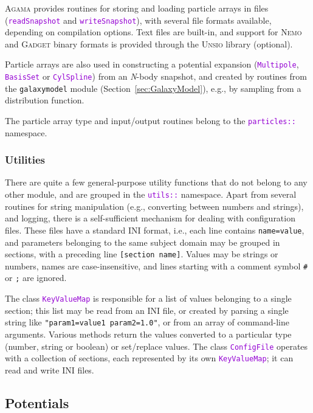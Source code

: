 \documentclass[12pt]{article}
\newcommand{\Agama}{\textsc{Agama}\xspace}
\newcommand{\Nemo} {\textsc{Nemo}\xspace}
\newcommand{\Nbody}{\textsl{N}-body\xspace}
\newcommand{\ttt}[1]{\textcolor{darkviolet}{\texttt{#1}}}
\newcommand{\ppp}[1]{\textcolor{darkolive} {\texttt{#1}}}
\begin{document}
\Agama provides routines for storing and loading particle arrays in files (\ttt{readSnapshot} and \ttt{writeSnapshot}), with several file formats available, depending on compilation options. Text files are built-in, and support for \Nemo and \textsc{Gadget} binary formats is provided through the \textsc{Unsio} library (optional).

Particle arrays are also used in constructing a potential expansion (\ttt{Multipole}, \ttt{BasisSet} or \ttt{CylSpline}) from an \Nbody snapshot, and created by routines from the \texttt{galaxymodel} module (Section~\ref{sec:GalaxyModel}), e.g., by sampling from a distribution function.

The particle array type and input/output routines belong to the \ttt{particles::} name\-space.


\subsubsection{Utilities}  \label{sec:Utilities}

There are quite a few general-purpose utility functions that do not belong to any other module, and are grouped in the \ttt{utils::} namespace. 
Apart from several routines for string manipulation (e.g., converting between numbers and strings), and logging, there is a self-sufficient mechanism for dealing with configuration files. These files have a standard INI format, i.e., each line contains \ppp{name=value}, and parameters belonging to the same subject domain may be grouped in sections, with a preceding line \ppp{[section name]}. Values may be strings or numbers, names are case-insensitive, and lines starting with a comment symbol \texttt{\#} or \texttt{;} are ignored.

The class \ttt{KeyValueMap} is responsible for a list of values belonging to a single section; this list may be read from an INI file, or created by parsing a single string like \ppp{"param1=value1 param2=1.0"}, or from an array of command-line arguments. Various methods return the values converted to a particular type (number, string or boolean) or set/replace values.
The class \ttt{ConfigFile} operates with a collection of sections, each represented by its own \ttt{KeyValueMap}; it can read and write INI files.


\subsection{Potentials}  \label{sec:Potential}
\end{document}
